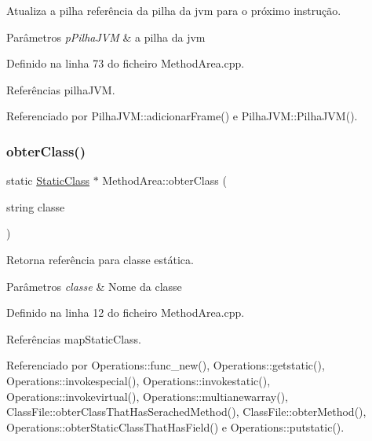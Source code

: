 Atualiza a pilha referência da pilha da jvm para o próximo instrução. 


\begin{DoxyParams}{Parâmetros}
{\em p\+Pilha\+J\+VM} & a pilha da jvm \\
\hline
\end{DoxyParams}


Definido na linha 73 do ficheiro Method\+Area.\+cpp.



Referências pilha\+J\+VM.



Referenciado por Pilha\+J\+V\+M\+::adicionar\+Frame() e Pilha\+J\+V\+M\+::\+Pilha\+J\+V\+M().

\mbox{\label{classMethodArea_a6e9d922892887daadd4624729268094f}} 
\subsubsection{\texorpdfstring{obter\+Class()}{obterClass()}}
{\footnotesize\ttfamily static \hyperlink{classStaticClass}{Static\+Class} $\ast$ Method\+Area\+::obter\+Class (\begin{DoxyParamCaption}\item[{string}]{classe }\end{DoxyParamCaption})\hspace{0.3cm}{\ttfamily [static]}}



Retorna referência para classe estática. 


\begin{DoxyParams}{Parâmetros}
{\em classe} & Nome da classe \\
\hline
\end{DoxyParams}


Definido na linha 12 do ficheiro Method\+Area.\+cpp.



Referências map\+Static\+Class.



Referenciado por Operations\+::func\+\_\+new(), Operations\+::getstatic(), Operations\+::invokespecial(), Operations\+::invokestatic(), Operations\+::invokevirtual(), Operations\+::multianewarray(), Class\+File\+::obter\+Class\+That\+Has\+Serached\+Method(), Class\+File\+::obter\+Method(), Operations\+::obter\+Static\+Class\+That\+Has\+Field() e Operations\+::putstatic().



